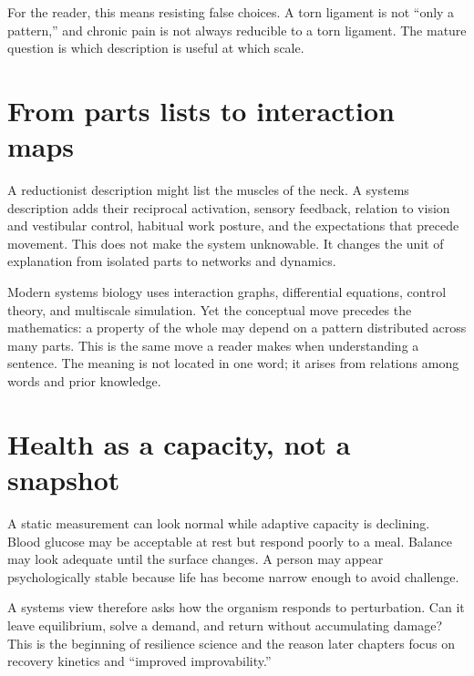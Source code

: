 For the reader, this means resisting false choices. A torn ligament is not ``only a pattern,'' and chronic pain is not always reducible to a torn ligament. The mature question is which description is useful at which scale.

\section{From parts lists to interaction maps}\label{from-parts-lists-to-interaction-maps}

A reductionist description might list the muscles of the neck. A systems description adds their reciprocal activation, sensory feedback, relation to vision and vestibular control, habitual work posture, and the expectations that precede movement. This does not make the system unknowable. It changes the unit of explanation from isolated parts to networks and dynamics.

Modern systems biology uses interaction graphs, differential equations, control theory, and multiscale simulation. Yet the conceptual move precedes the mathematics: a property of the whole may depend on a pattern distributed across many parts. This is the same move a reader makes when understanding a sentence. The meaning is not located in one word; it arises from relations among words and prior knowledge.

\section{Health as a capacity, not a snapshot}\label{health-as-a-capacity-not-a-snapshot}

A static measurement can look normal while adaptive capacity is declining. Blood glucose may be acceptable at rest but respond poorly to a meal. Balance may look adequate until the surface changes. A person may appear psychologically stable because life has become narrow enough to avoid challenge.

A systems view therefore asks how the organism responds to perturbation. Can it leave equilibrium, solve a demand, and return without accumulating damage? This is the beginning of resilience science and the reason later chapters focus on recovery kinetics and ``improved improvability.''
